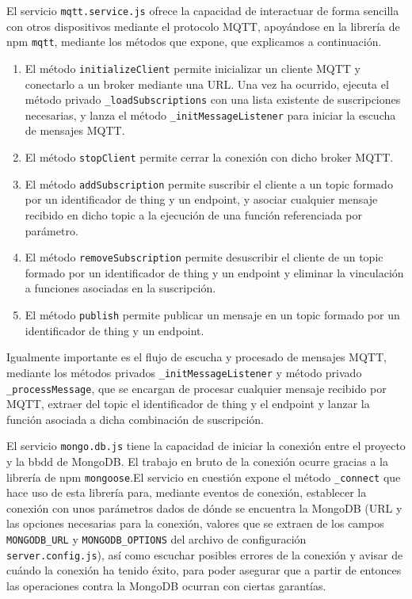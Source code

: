 El servicio \verb|mqtt.service.js| ofrece la capacidad de interactuar de forma sencilla con otros dispositivos mediante el protocolo MQTT, apoyándose en la librería de npm \verb|mqtt|, mediante los métodos que expone, que explicamos a continuación.
\begin{enumerate}
\item El método \verb|initializeClient| permite inicializar un cliente MQTT y conectarlo a un broker mediante una URL. Una vez ha ocurrido, ejecuta el método privado \verb|_loadSubscriptions| con una lista existente de suscripciones necesarias, y lanza el método \verb|_initMessageListener| para iniciar la escucha de mensajes MQTT.
\item El método \verb|stopClient| permite cerrar la conexión con dicho broker MQTT.
\item El método \verb|addSubscription| permite suscribir el cliente a un topic formado por un identificador de thing y un endpoint, y asociar cualquier mensaje recibido en dicho topic a la ejecución de una función referenciada por parámetro.
\item El método \verb|removeSubscription| permite desuscribir el cliente de un topic formado por un identificador de thing y un endpoint y eliminar la vinculación a funciones asociadas en la suscripción.
\item El método \verb|publish| permite publicar un mensaje en un topic formado por un identificador de thing y un endpoint.
\end{enumerate}
Igualmente importante es el flujo de escucha y procesado de mensajes MQTT, mediante los métodos privados \verb|_initMessageListener| y método privado \verb|_processMessage|, que se encargan de procesar cualquier mensaje recibido por MQTT, extraer del topic el identificador de thing y el endpoint y lanzar la función asociada a dicha combinación de suscripción.

\vspace{1cm}
  
El servicio \verb|mongo.db.js| tiene la capacidad de iniciar la conexión entre el proyecto y la \gls{bbdd} de MongoDB. El trabajo en bruto de la conexión ocurre gracias a la librería de npm \verb|mongoose|.El servicio en cuestión expone el método \verb|_connect| que hace uso de esta librería para, mediante eventos de conexión, establecer la conexión con unos parámetros dados de dónde se encuentra la MongoDB (URL y las opciones necesarias para la conexión, valores que se extraen de los campos \verb|MONGODB_URL| y \verb|MONGODB_OPTIONS| del archivo de configuración \verb|server.config.js|), así como escuchar posibles errores de la conexión y avisar de cuándo la conexión ha tenido éxito, para poder asegurar que a partir de entonces las operaciones contra la MongoDB ocurran con ciertas garantías.

